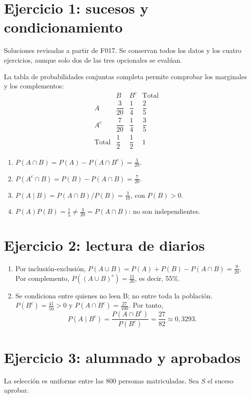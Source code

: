 \documentclass[11pt]{article}
\begin{document}
\renewcommand{\arraystretch}{2.2}
\section*{Ejercicio 1: sucesos y condicionamiento}
Soluciones revisadas a partir de F017. Se conservan todos los datos y los cuatro ejercicios, aunque solo dos de las tres opcionales se evalúan.

La tabla de probabilidades conjuntas completa permite comprobar los marginales y los complementos:
\[
\begin{array}{c|cc|c}
 & B & B^c & \text{Total}\\\hline
 A & \dfrac{3}{20} & \dfrac{1}{4} & \dfrac{2}{5}\\
 A^c & \dfrac{7}{20} & \dfrac{1}{4} & \dfrac{3}{5}\\\hline
 \text{Total} & \dfrac{1}{2} & \dfrac{1}{2} & 1
\end{array}
\]
\begin{enumerate}[label=(\alph*)]
\item $P(A\cap B)=P(A)-P(A\cap B^c)=\boxed{\frac{3}{20}}$.
\item $P(A^c\cap B)=P(B)-P(A\cap B)=\boxed{\frac{7}{20}}$.
\item $P(A\mid B)=P(A\cap B)/P(B)=\boxed{\frac{3}{10}}$, con $P(B)>0$.
\item $P(A)P(B)=\frac{1}{5}\ne \frac{3}{20}=P(A\cap B)$: no son independientes.
\end{enumerate}
\clearpage\section*{Ejercicio 2: lectura de diarios}
\begin{enumerate}[label=(\alph*)]
\item Por inclusión-exclusión, $P(A\cup B)=P(A)+P(B)-P(A\cap B)=\frac{9}{20}$. Por complemento, $P((A\cup B)^c)=\boxed{\frac{11}{20}}$, es decir, 55\%.
\item Se condiciona entre quienes no leen B; no entre toda la población. $P(B^c)=\frac{41}{50}>0$ y $P(A\cap B^c)=\frac{27}{100}$. Por tanto,\[P(A\mid B^c)=\frac{P(A\cap B^c)}{P(B^c)}=\boxed{\frac{27}{82}}\approx 0,3293.\]
\end{enumerate}\clearpage\section*{Ejercicio 3: alumnado y aprobados}
La selección es uniforme entre las 800 personas matriculadas. Sea $S$ el suceso aprobar.
\end{document}
